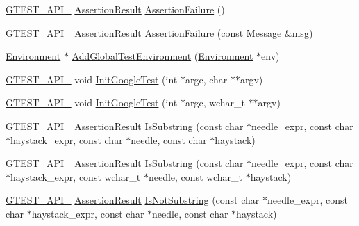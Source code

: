 \begin{DoxyCompactItemize}
\item 
\hyperlink{gtest-port_8h_aa73be6f0ba4a7456180a94904ce17790}{G\+T\+E\+S\+T\+\_\+\+A\+P\+I\+\_\+} \hyperlink{classtesting_1_1AssertionResult}{Assertion\+Result} \hyperlink{namespacetesting_a75cb789614cb1c28c34627a4a3c053df}{Assertion\+Failure} ()
\item 
\hyperlink{gtest-port_8h_aa73be6f0ba4a7456180a94904ce17790}{G\+T\+E\+S\+T\+\_\+\+A\+P\+I\+\_\+} \hyperlink{classtesting_1_1AssertionResult}{Assertion\+Result} \hyperlink{namespacetesting_a6bdf82adf159dcda822d75746937ffa9}{Assertion\+Failure} (const \hyperlink{classtesting_1_1Message}{Message} \&msg)
\item 
\hyperlink{classtesting_1_1Environment}{Environment} $\ast$ \hyperlink{namespacetesting_a460d7b998622e332392c1e00be3a60d5}{Add\+Global\+Test\+Environment} (\hyperlink{classtesting_1_1Environment}{Environment} $\ast$env)
\item 
\hyperlink{gtest-port_8h_aa73be6f0ba4a7456180a94904ce17790}{G\+T\+E\+S\+T\+\_\+\+A\+P\+I\+\_\+} void \hyperlink{namespacetesting_afd726ae08c9bd16dc52f78c822d9946b}{Init\+Google\+Test} (int $\ast$argc, char $\ast$$\ast$argv)
\item 
\hyperlink{gtest-port_8h_aa73be6f0ba4a7456180a94904ce17790}{G\+T\+E\+S\+T\+\_\+\+A\+P\+I\+\_\+} void \hyperlink{namespacetesting_ae5a88709a4a7529e30c83242156556b3}{Init\+Google\+Test} (int $\ast$argc, wchar\+\_\+t $\ast$$\ast$argv)
\item 
\hyperlink{gtest-port_8h_aa73be6f0ba4a7456180a94904ce17790}{G\+T\+E\+S\+T\+\_\+\+A\+P\+I\+\_\+} \hyperlink{classtesting_1_1AssertionResult}{Assertion\+Result} \hyperlink{namespacetesting_a390c4f66fe7e9098117eb77e5fffa4ad}{Is\+Substring} (const char $\ast$needle\+\_\+expr, const char $\ast$haystack\+\_\+expr, const char $\ast$needle, const char $\ast$haystack)
\item 
\hyperlink{gtest-port_8h_aa73be6f0ba4a7456180a94904ce17790}{G\+T\+E\+S\+T\+\_\+\+A\+P\+I\+\_\+} \hyperlink{classtesting_1_1AssertionResult}{Assertion\+Result} \hyperlink{namespacetesting_aa1c82529c7591d2a9fd016de45dd9113}{Is\+Substring} (const char $\ast$needle\+\_\+expr, const char $\ast$haystack\+\_\+expr, const wchar\+\_\+t $\ast$needle, const wchar\+\_\+t $\ast$haystack)
\item 
\hyperlink{gtest-port_8h_aa73be6f0ba4a7456180a94904ce17790}{G\+T\+E\+S\+T\+\_\+\+A\+P\+I\+\_\+} \hyperlink{classtesting_1_1AssertionResult}{Assertion\+Result} \hyperlink{namespacetesting_a2288dcf4249f88af67dcd46544dc49a6}{Is\+Not\+Substring} (const char $\ast$needle\+\_\+expr, const char $\ast$haystack\+\_\+expr, const char $\ast$needle, const char $\ast$haystack)

\end{DoxyCompactItemize}
